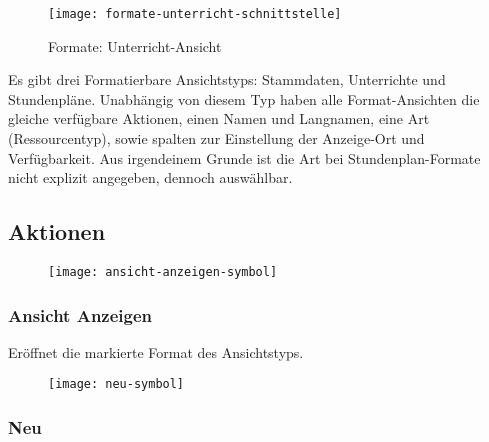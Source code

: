 \newpage

\begin{wrapfigure}{r}{0.4\textwidth}
	\centering
	\texttt{[image: formate-unterricht-schnittstelle]}
	\vspace{-5pt}
	\caption{Formate: Unterricht-Ansicht}
	\label{fig:formate-unterricht-schnittstelle}
	\vspace{-15pt}
\end{wrapfigure}

\noindent
Es gibt drei Formatierbare Ansichtstyps: Stammdaten, Unterrichte und Stundenpläne. Unabhängig von diesem Typ haben alle Format-Ansichten die gleiche verfügbare Aktionen, einen Namen und Langnamen, eine Art (Ressourcentyp), sowie spalten zur Einstellung der Anzeige-Ort und Verfügbarkeit. Aus irgendeinem Grunde ist die Art bei Stundenplan-Formate nicht explizit angegeben, dennoch auswählbar.\\

\subsection{Aktionen}

\begin{wrapfigure}{r}{.05\textwidth}
	\vspace{-25pt}
	\texttt{[image: ansicht-anzeigen-symbol]}
	\vspace{-35pt}
\end{wrapfigure}

\subsubsection{Ansicht Anzeigen}

\vspace{10pt}

\noindent
Eröffnet die markierte Format des Ansichtstyps.\\

\begin{wrapfigure}{r}{.05\textwidth}
	\vspace{-25pt}
	\texttt{[image: neu-symbol]}
	\vspace{-35pt}
\end{wrapfigure}

\subsubsection{Neu}

\vspace{10pt}

